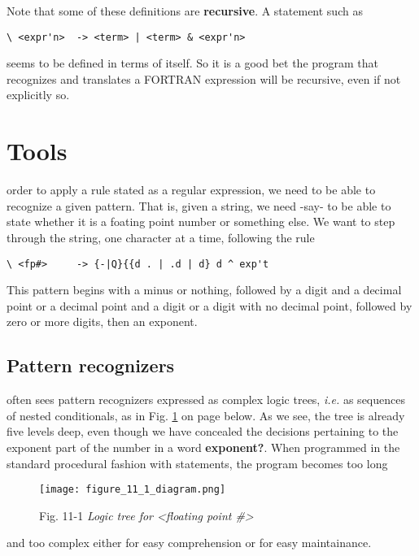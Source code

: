 Note that some of these definitions are \textbf{recursive}. A statement such as

\begin{verbatim}
\ <expr'n>  -> <term> | <term> & <expr'n>
\end{verbatim}

seems to be defined in terms of itself. So it is a good bet the program that recognizes and translates a FORTRAN expression will be recursive, even if not explicitly so.

\section{Tools}
 order to apply a rule stated as a regular expression, we need to be able to recognize a given pattern. That is, given a string, we need -say- to be able to state whether it is a foating point number or something else. We want to step through the string, one character at a time, following the rule

\begin{verbatim}
\ <fp#>     -> {-|Q}{{d . | .d | d} d ^ exp't
\end{verbatim}

This pattern begins with a minus or nothing, followed by a digit and a decimal point or a decimal point and a digit or a digit with no decimal point, followed by zero or more digits, then an exponent.

\subsection{Pattern recognizers}
 often sees pattern recognizers expressed as complex logic trees, \textit{i.e.} as sequences of nested conditionals, as in Fig. \ref{fig:11_01} on page \pageref{fig:11_01} below. As we see, the tree is already five levels deep, even though we have concealed the decisions pertaining to the exponent part of the number in a word \textbf{exponent?}. When programmed in the standard procedural fashion with  statements, the program becomes too long

\begin{figure}
    \texttt{[image: figure\_11\_1\_diagram.png]}
    \caption{Fig. 11-1 \textit{Logic tree for <floating point \#>}}
    \label{fig:11_01}
\end{figure}

and too complex either for easy comprehension or for easy maintainance.

